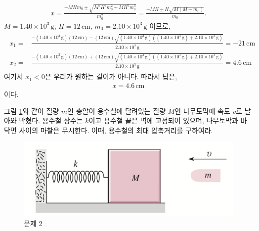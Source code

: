 \documentclass[floatfix,nofootinbib,superscriptaddress,fleqn]{revtex4-2}
\begin{document}
\begin{itemize}
\begin{align}
    x = \frac{-MHm_0\pm\sqrt{M^2H^2m_0^2+MH^2m_0^3}}{m_0^2}
    = \frac{-MH\pm H\sqrt{M(M+m_0)}}{m_0}.
  \end{align}
  $M=1.40\times 10^{3}\,\mathrm{g}$, $H=12\,\mathrm{cm}$,
  $m_0=2.10\times 10^3\,\mathrm{g}$ 이므로,
  \begin{align}
    \begin{split}
      x_1 =& \frac{-(1.40\times 10^{3}\,\mathrm{g})(12\,\mathrm{cm}) 
      - (12\,\mathrm{cm})\sqrt{(1.40\times 10^{3}\,\mathrm{g})
      ((1.40\times 10^{3}\,\mathrm{g})
      +2.10\times 10^3\,\mathrm{g})}}{2.10\times 10^3\,\mathrm{g}}
      =-21\,\mathrm{cm}  \\
      x_2 =& \frac{-(1.40\times 10^{3}\,\mathrm{g})(12\,\mathrm{cm}) 
      + (12\,\mathrm{cm})\sqrt{(1.40\times 10^{3}\,\mathrm{g})
      ((1.40\times 10^{3}\,\mathrm{g})
      +2.10\times 10^3\,\mathrm{g})}}{2.10\times 10^3\,\mathrm{g}}
      =4.6\,\mathrm{cm}
    \end{split}
  \end{align}
  여기서 $x_1<0$은 우리가 원하는 길이가 아니다. 따라서 답은,
  \begin{align}
    x = 4.6\,\mathrm{cm}
  \end{align}
  이다.
\end{itemize}
\vspace{1cm}
그림 \ref{fig:2}와 같이 질량 $m$인 총알이 용수철에 달려있는 질량 $M$인
나무토막에 속도 $v$로 날아와 박혔다. 용수철 상수는 $k$이고 용수철 끝은
벽에 고정되어 있으며, 나무토막과 바닥면 사이의 마찰은 무시한다. 이때,
용수철의 최대 압축거리를 구하여라. 
\begin{figure}[ht]
  \centering
\includegraphics[scale=0.4]{Qfig11-2-20220406.png}
  \caption{문제 2}
  \label{fig:2}
\end{figure}
\end{document}
